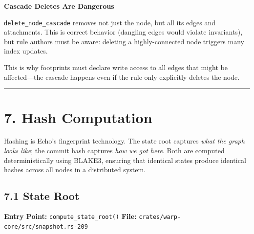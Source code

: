 \documentclass[11pt]{book}
\begin{document}
\begin{watchout}
\textbf{Cascade Deletes Are Dangerous}

\texttt{delete\_node\_cascade} removes not just the node, but all its edges and attachments. This is correct behavior (dangling edges would violate invariants), but rule authors must be aware: deleting a highly-connected node triggers many index updates.

This is why footprints must declare write access to all edges that might be affected---the cascade happens even if the rule only explicitly deletes the node.
\end{watchout}

\begin{center}\rule{0.5\linewidth}{0.5pt}\end{center}

\section{7. Hash Computation}\label{hash-computation}

\begin{tourguide}
Hashing is Echo's fingerprint technology. The state root captures \emph{what the graph looks like}; the commit hash captures \emph{how we got here}. Both are computed deterministically using BLAKE3, ensuring that identical states produce identical hashes across all nodes in a distributed system.
\end{tourguide}

\subsection{7.1 State Root}\label{state-root}

\textbf{Entry Point:} \texttt{compute\_state\_root()} \textbf{File:}
\texttt{crates/warp-core/src/snapshot.rs-209}
\end{document}
